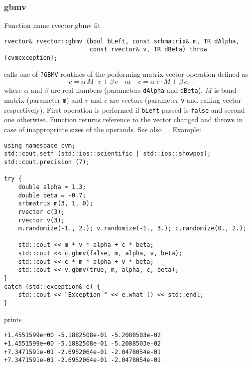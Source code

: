 \subsubsection{gbmv}
Function%
\pdfdest name {rvector.gbmv} fit
\begin{verbatim}
rvector& rvector::gbmv (bool bLeft, const srbmatrix& m, TR dAlpha,
                        const rvector& v, TR dBeta) throw (cvmexception);
\end{verbatim}
calls one of \verb"?GBMV" routines of the
performing matrix-vector operation defined as
\begin{equation*}
c=\alpha\,M\cdot v + \beta\,c\quad\text{or}\quad c=\alpha\,v\cdot M + \beta\, c,
\end{equation*}
where $\alpha$ and $\beta$ are real numbers 
(parameters \verb"dAlpha" and \verb"dBeta"),
$M$ is  band matrix (parameter \verb"m")
and $v$ and $c$ are vectors (parameter \verb"v"
and calling vector respectively).
First operation is performed if \verb"bLeft" passed
is \verb"false" and second one otherwise.
Function
returns  reference to the vector changed and throws
in case of inappropriate sizes of the operands.
See also
,
.
Example:
\begin{Verbatim}
using namespace cvm;
std::cout.setf (std::ios::scientific | std::ios::showpos);
std::cout.precision (7);

try {
    double alpha = 1.3;
    double beta = -0.7;
    srbmatrix m(3, 1, 0);
    rvector c(3);
    rvector v(3);
    m.randomize(-1., 2.); v.randomize(-1., 3.); c.randomize(0., 2.);

    std::cout << m * v * alpha + c * beta;
    std::cout << c.gbmv(false, m, alpha, v, beta);
    std::cout << c * m * alpha + v * beta;
    std::cout << v.gbmv(true, m, alpha, c, beta);
}
catch (std::exception& e) {
    std::cout << "Exception " << e.what () << std::endl;
}
\end{Verbatim}
prints
\begin{Verbatim}
+1.4551599e+00 -5.1882508e-01 -5.2088503e-02
+1.4551599e+00 -5.1882508e-01 -5.2088503e-02
+7.3471591e-01 -2.6952064e-01 -2.0478054e-01
+7.3471591e-01 -2.6952064e-01 -2.0478054e-01
\end{Verbatim}
\newpage





